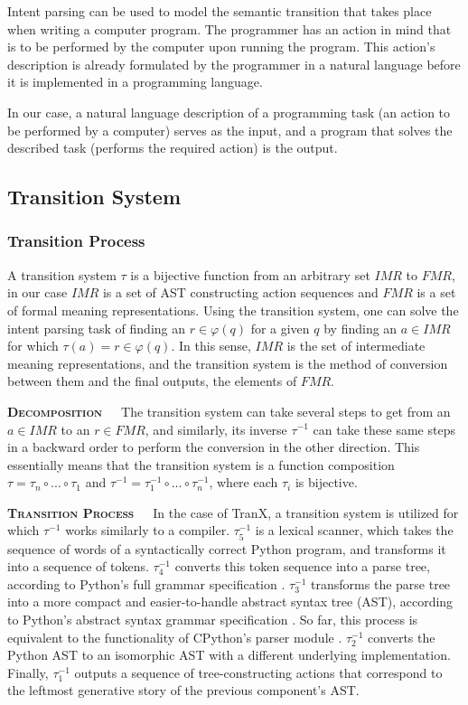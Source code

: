 Intent parsing can be used to model the semantic transition that takes place when writing
a computer program. The programmer has an action in mind that is to be performed by the
computer upon running the program. This action's description is already formulated by
the programmer in a natural language before it is implemented in a programming language.

In our case, a natural language description of a programming task (an action to be
performed by a computer) serves as the input, and a program that solves the described
task (performs the required action) is the output.

\subsection{Transition System}

\subsubsection{Transition Process}

A transition system \(\tau\) is a bijective function from an arbitrary set \(IMR\) to \(FMR\),
in our case \(IMR\) is a set of AST constructing action sequences and \(FMR\) is a set of formal
meaning representations. Using the transition system, one can solve the intent parsing task of
finding an \(r \in \varphi(q)\) for a given \(q\) by finding an \(a \in IMR\) for which
\(\tau(a) = r \in \varphi(q)\). In this sense, \(IMR\) is the set of intermediate meaning
representations, and the transition system is the method of conversion between them and the
final outputs, the elements of \(FMR\).

\textbf{\textsc{Decomposition}}\ \ \ The transition system can take several steps to get
from an \(a \in IMR\) to an \(r \in FMR\), and similarly, its inverse \(\tau^{-1}\)
can take these same steps in a backward order to perform the conversion in the other direction.
This essentially means that the transition system is a function composition
\(\tau = \tau_{n} \circ ... \circ \tau_{1}\) and \(\tau^{-1} = \tau_{1}^{-1} \circ \dots 
\circ \tau_{n}^{-1}\), where each \(\tau_{i}\) is bijective.

\textbf{\textsc{Transition Process}}\ \ \ In the case of TranX, a transition system is utilized
for which \(\tau^{-1}\) works similarly to a compiler. \(\tau_{5}^{-1}\) is a lexical scanner, 
which takes the sequence of words of a syntactically correct Python program, and transforms it
into a sequence of tokens. \(\tau_{4}^{-1}\) converts this token sequence into a parse tree,
according to Python's full grammar specification \cite{PythonFullGrammar}. \(\tau_{3}^{-1}\) 
transforms the parse tree into a more compact and easier-to-handle abstract syntax tree (AST),
according to Python's abstract syntax grammar specification \cite{PythonAbstractGrammar}.
So far, this process is equivalent to the functionality of CPython's parser module
\cite{CPythonCompiler}. \(\tau_{2}^{-1}\) converts the Python AST to an isomorphic AST
with a different underlying implementation. Finally, \(\tau_{1}^{-1}\) outputs a sequence
of tree-constructing actions that correspond to the leftmost generative story
of the previous component's AST.

